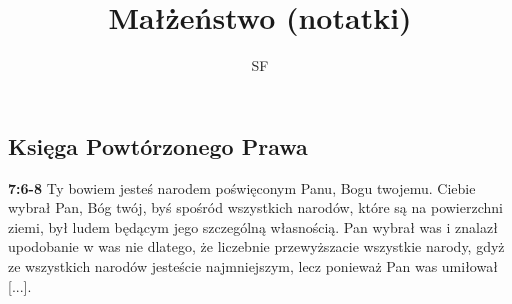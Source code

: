 \documentclass[a4paper,11pt]{article}
\title{Małżeństwo (notatki)}
\author{SF}
\newcommand{\paddr}[1]{\textbf{#1}}
\begin{document}
\begin{fussy}

\maketitle
\tableofcontents

\section{Księga Powtórzonego Prawa}

\paddr{7:6-8} Ty bowiem jesteś narodem poświęconym Panu, Bogu twojemu. Ciebie wybrał Pan, Bóg twój, byś spośród wszystkich narodów, które są na powierzchni ziemi, był ludem będącym jego szczególną własnością. Pan wybrał was i znalazł upodobanie w was nie dlatego, że liczebnie przewyższacie wszystkie narody, gdyż ze wszystkich narodów jesteście najmniejszym, lecz ponieważ Pan was umiłował [...].

\end{fussy}
\end{document}
